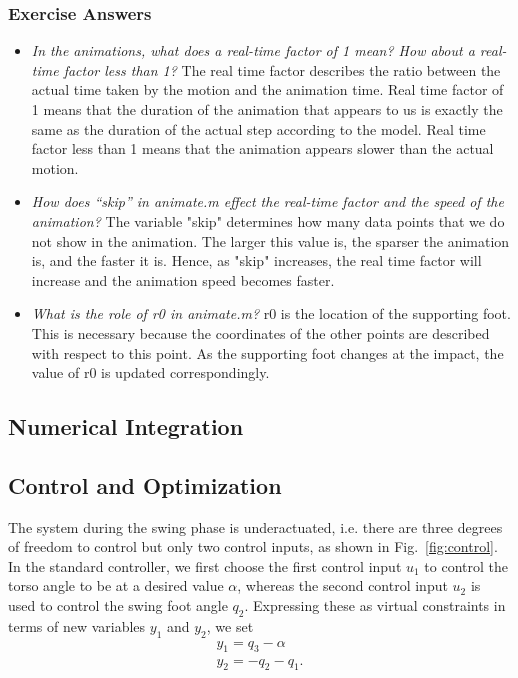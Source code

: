 \subsubsection{Exercise Answers}
\begin{itemize}
\item \emph{ In the animations, what does a real-time factor of 1 mean? How about a real-time factor less than 1?}
The real time factor describes the ratio between the actual time taken by the motion and the animation time. Real time factor of 1 means that the duration of the animation that appears to us is exactly the same as the duration of the actual step according to the model. Real time factor less than 1 means that the animation appears slower than the actual motion.
\item \emph{How does “skip” in animate.m effect the real-time factor and the speed of the animation?}
The variable "skip" determines how many data points that we do not show in the animation. The larger this value is, the sparser the animation is, and the faster it is. Hence, as "skip" increases, the real time factor will increase and the animation speed becomes faster.
\item \emph{What is the role of r0 in animate.m?}
r0 is the location of the supporting foot. This is necessary because the coordinates of the other points are described with respect to this point. As the supporting foot changes at the impact, the value of r0 is updated correspondingly. 
\end{itemize}

\subsection{Numerical Integration}
\label{sec:num_int}

\subsection{Control and Optimization}
\label{sec:control_opt}

The system during the swing phase is underactuated, i.e. there are three degrees of freedom to control but only two control inputs, as shown in Fig.~\ref{fig:control}. In the standard controller, we first choose the first control input $u_1$ to control the torso angle to be at a desired value $\alpha$, whereas the second control input $u_2$ is used to control the swing foot angle $q_2$. Expressing these as virtual constraints in terms of new variables $y_1$ and $y_2$, we set
\begin{align}
y_1 = q_3 - \alpha \\
y_2 = -q_2 - q_1. 
\end{align}


